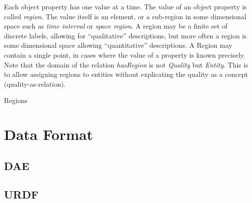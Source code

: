 Each object property has one value at a time. The value of an object property is called \emph{region}.
The value itself is an element, or a sub-region in some dimensional
space such as \emph{time interval} or \emph{space region}.
A region may be a finite set of discrete labels, allowing for ``qualitative'' descriptions,
but more often a region is some dimensional space allowing ``quantitative'' descriptions.
A Region may contain a single point, in cases where the value of a property is known precisely.
Note that the domain of the relation \emph{hasRegion} is not \emph{Quality} but \emph{Entity}.
This is to allow assigning regions to entities without explicating the quality as a concept (quality-as-relation).

\begin{ODP}{Regions}
\end{ODP}

\section{Data Format}
\label{sec:background:formats}
\subsection{DAE}
\subsection{URDF}

